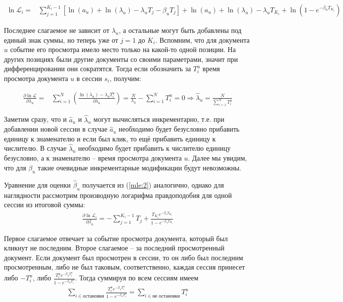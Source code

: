 \documentclass[diploma]{nanolab2015}
\begin{document}
  \begin{align}
    \ln\mathcal{L}_i = & \sum_{j=1}^{K_i-1} \left[ \ln(a_u) + \ln(\lambda_u) - \lambda_u T_j - \beta_u T_j \right] + \ln(a_u) + \ln(\lambda_u) - \lambda_u T_{K_i} + \ln(1-e^{-\beta_u T_{K_i}})
  \end{align}

  Последнее слагаемое не зависит от $\lambda_u$, а остальные могут быть добавлены под единый знак суммы, но теперь уже от $j=1$ до $K_i$. Вспомним, что для документа $u$ событие его просмотра имело место только на какой-то одной позиции. На других позициях были другие документы со своими параметрами, значит при дифференцировании они сократятся. Тогда если обозначить за $T_i^u$ время просмотра документа $u$ в сессии $s_i$, получим:

  \begin{align}
    \frac{\partial \ln \mathcal{L}}{\partial \lambda_u} = & \sum_{i=1}^{N} \left( \frac{\ln(\lambda_u) - \lambda_u T_i^u}{\partial \lambda_u} \right) = \frac{N}{\lambda_u} - \sum_{i=1}^{N}T_i^u = 0 \Rightarrow \hat{\lambda}_u = \frac{N}{\sum_{i=1}^{N}T_i^u}
  \end{align}

  Заметим сразу, что и $\hat{a}_u$ и $\hat{\lambda}_u$ могут вычисляться инкрементарно, т.е. при добавлении новой сессии в случае $\hat{a}_u$ необходимо будет безусловно прибавить единицу к знаменателю и если был клик, то ещё прибавить единицу к числителю. В случае $\hat{\lambda}_u$ необходимо будет прибавить к числителю единицу безусловно, а к знаменателю -- время просмотра документа $u$. Далее мы увидим, что для $\beta_u$ такие очевидные инкрементарные модификации будут невозможны.

  Уравнение для оценки $\hat{\beta}_u$ получается из (\ref{mle:2}) аналогично, однако для наглядности рассмотрим производную логарифма правдоподобия для одной сессии из итоговой суммы:
  \begin{align}
    \frac{\partial \ln \mathcal{L}_i}{\partial \beta_u} = -\sum_{j=1}^{K_i-1} T_j + \frac{T_{K_i} e^{-\beta_u T_{K_i}}}{1 - e^{-\beta_u T_{K_i}}} \label{grad:1}
  \end{align}

  Первое слагаемое отвечает за событие просмотра документа, который был кликнут не последним. Второе слагаемое -- за последний просмотренный документ. Если документ был просмотрен в сессии, то он либо был последним просмотренным, либо не был таковым, соответственно, каждая сессия принесет либо $-T_i^u$, либо $\frac{T_i^u e^{-\beta_u T_i^u}}{1 - e^{-\beta_u T_i^u}}$. Тогда суммируя по всем сессиям имеем
  \begin{align}
    \sum_{i \in \text{остановки}}\frac{T_i^u e^{-\beta_u T_i^u}}{1 - e^{-\beta_u T_i^u}} = \sum_{i \in \text{не остановки}} T_i^u
  \end{align}
\end{document}
